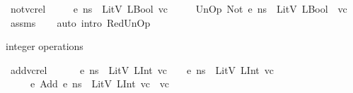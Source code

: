\begin{isabellebody}
\endisatagproof
{\isafoldproof}%
%
\isadelimproof
\isanewline
%
\endisadelimproof
\isanewline
{}\isamarkupfalse%
\ not{\isacharunderscore}{\kern0pt}vc{\isacharunderscore}{\kern0pt}rel{\isacharcolon}{\kern0pt}\isanewline
\ \ \ {\isachardoublequoteopen}{\isasymLambda}{\isacharcomma}{\kern0pt}{\isasymGamma}{\isacharcomma}{\kern0pt}{\isasymOmega}\ {\isasymturnstile}\ {\isasymlangle}e{\isacharcomma}{\kern0pt}\ ns{\isasymrangle}\ {\isasymDown}\ LitV\ {\isacharparenleft}{\kern0pt}LBool\ vc{\isacharparenright}{\kern0pt}{\isachardoublequoteclose}\isanewline
\ \ \ {\isachardoublequoteopen}{\isasymLambda}{\isacharcomma}{\kern0pt}{\isasymGamma}{\isacharcomma}{\kern0pt}{\isasymOmega}\ {\isasymturnstile}\ {\isasymlangle}UnOp\ Not\ e{\isacharcomma}{\kern0pt}\ ns{\isasymrangle}\ {\isasymDown}\ LitV\ {\isacharparenleft}{\kern0pt}LBool\ {\isacharparenleft}{\kern0pt}{\isasymnot}\ vc{\isacharparenright}{\kern0pt}{\isacharparenright}{\kern0pt}{\isachardoublequoteclose}\isanewline
%
\isadelimproof
\ \ %
\endisadelimproof
%
\isatagproof
{}\isamarkupfalse%
\ assms\isanewline
\ \ \isamarkupfalse%
\ {\isacharparenleft}{\kern0pt}auto\ intro{\isacharcolon}{\kern0pt}\ RedUnOp{\isacharparenright}{\kern0pt}%
\endisatagproof
{\isafoldproof}%
%
\isadelimproof
%
\endisadelimproof
%
\begin{isamarkuptext}%
integer operations%
\end{isamarkuptext}\isamarkuptrue%
\isamarkupfalse%
\ add{\isacharunderscore}{\kern0pt}vc{\isacharunderscore}{\kern0pt}rel{\isacharcolon}{\kern0pt}\ \isanewline
\ \ \ {\isachardoublequoteopen}{\isasymLambda}{\isacharcomma}{\kern0pt}{\isasymGamma}{\isacharcomma}{\kern0pt}{\isasymOmega}\ {\isasymturnstile}\ {\isasymlangle}e{}{\isacharcomma}{\kern0pt}\ ns{\isasymrangle}\ {\isasymDown}\ LitV\ {\isacharparenleft}{\kern0pt}LInt\ vc{}{\isacharparenright}{\kern0pt}{\isachardoublequoteclose}\ \ {\isachardoublequoteopen}{\isasymLambda}{\isacharcomma}{\kern0pt}{\isasymGamma}{\isacharcomma}{\kern0pt}{\isasymOmega}\ {\isasymturnstile}\ {\isasymlangle}e{}{\isacharcomma}{\kern0pt}\ ns{\isasymrangle}\ {\isasymDown}\ LitV\ {\isacharparenleft}{\kern0pt}LInt\ vc{}{\isacharparenright}{\kern0pt}{\isachardoublequoteclose}\isanewline
\ \ \ {\isachardoublequoteopen}{\isasymLambda}{\isacharcomma}{\kern0pt}{\isasymGamma}{\isacharcomma}{\kern0pt}{\isasymOmega}\ {\isasymturnstile}\ {\isasymlangle}e{}\ {\isasymguillemotleft}Add{\isasymguillemotright}\ e{}{\isacharcomma}{\kern0pt}\ ns{\isasymrangle}\ {\isasymDown}\ LitV\ {\isacharparenleft}{\kern0pt}LInt\ {\isacharparenleft}{\kern0pt}vc{}\ {\isacharplus}{\kern0pt}\ vc{}{\isacharparenright}{\kern0pt}{\isacharparenright}{\kern0pt}{\isachardoublequoteclose}\isanewline

\end{isabellebody}
